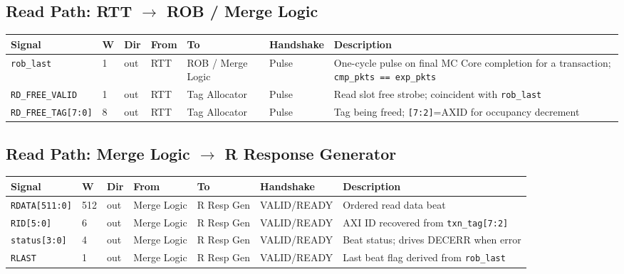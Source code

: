 \documentclass[11pt,a4paper]{article}
\begin{document}
\subsection{Read Path: RTT $\rightarrow$ ROB / Merge Logic}

\begin{tabularx}{\textwidth}{L{3.0cm} C{0.8cm} C{1.0cm} L{2.2cm} L{2.2cm} L{2.0cm} X}
\toprule
\textbf{Signal} & \textbf{W} & \textbf{Dir} & \textbf{From} & \textbf{To} & \textbf{Handshake} & \textbf{Description} \\
\midrule
\texttt{rob\_last}      & 1 & out & RTT & ROB / Merge Logic & Pulse & One-cycle pulse on final MC Core completion for a transaction; \texttt{cmp\_pkts == exp\_pkts} \\
\midrule
\texttt{RD\_FREE\_VALID}   & 1 & out & RTT & Tag Allocator & Pulse & Read slot free strobe; coincident with \texttt{rob\_last} \\
\texttt{RD\_FREE\_TAG[7:0]} & 8 & out & RTT & Tag Allocator & Pulse & Tag being freed; \texttt{[7:2]}=AXID for occupancy decrement \\
\bottomrule
\end{tabularx}

\subsection{Read Path: Merge Logic $\rightarrow$ R Response Generator}

\begin{tabularx}{\textwidth}{L{3.0cm} C{0.8cm} C{1.0cm} L{2.2cm} L{2.2cm} L{2.0cm} X}
\toprule
\textbf{Signal} & \textbf{W} & \textbf{Dir} & \textbf{From} & \textbf{To} & \textbf{Handshake} & \textbf{Description} \\
\midrule
\texttt{RDATA[511:0]}  & 512 & out & Merge Logic & R Resp Gen & VALID/READY & Ordered read data beat \\
\texttt{RID[5:0]}      & 6   & out & Merge Logic & R Resp Gen & VALID/READY & AXI ID recovered from \texttt{txn\_tag[7:2]} \\
\texttt{status[3:0]}   & 4   & out & Merge Logic & R Resp Gen & VALID/READY & Beat status; drives DECERR when error \\
\texttt{RLAST}         & 1   & out & Merge Logic & R Resp Gen & VALID/READY & Last beat flag derived from \texttt{rob\_last} \\
\bottomrule
\end{tabularx}
\end{document}
